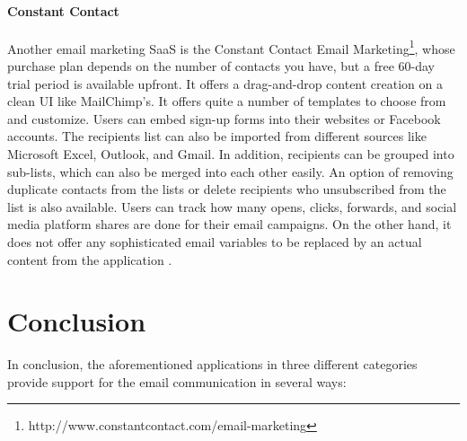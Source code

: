\paragraph{Constant Contact}
Another email marketing \ac{SaaS} is the Constant Contact Email Marketing\footnote{http://www.constantcontact.com/email-marketing}, whose purchase plan depends on the number of contacts you have, but a free 60-day trial period is available upfront. It offers a drag-and-drop content creation on a clean \ac{UI} like MailChimp's. It offers quite a number of templates to choose from and customize. Users can embed sign-up forms into their websites or Facebook accounts. The recipients list can also be imported from different sources like Microsoft Excel, Outlook, and Gmail. In addition, recipients can be grouped into sub-lists, which can also be merged into each other easily. An option of removing duplicate contacts from the lists or delete recipients who unsubscribed from the list is also available. Users can track how many opens, clicks, forwards, and social media platform shares are done for their email campaigns. On the other hand, it does not offer any sophisticated email variables to be replaced by an actual content from the application \citep{ConstantContactInc.2013,ConstantContactInc.2013a,ConstantContactInc.2011}. 

\clearpage

\section{Conclusion}
\label{sec:3.3:Conc}
In conclusion, the aforementioned applications in three different categories provide support for the email communication in several ways:

